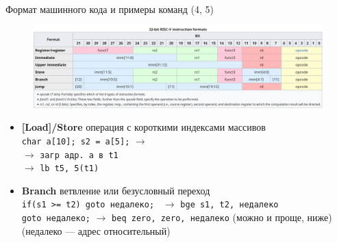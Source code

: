 \documentclass[xetex,aspectratio=43]{beamer}
\begin{document}
\begin{frame}[fragile]{Формат машинного кода и примеры команд (4, 5)}
    \begin{figure}
        \includegraphics[width=1\linewidth]{img/12.RISCV_instruction_format_wikipedia}
    \end{figure}

    \begin{itemize}
        \tightlist
        \item \textbf{[Load]/Store} операция с короткими индексами массивов\\
        \texttt{char a[10]; s2 = a[5];} $\rightarrow$ \\
        $\rightarrow$ \texttt{загр адр. a в t1} \\
        {\color{white}$\rightarrow$} \texttt{lb t5, 5(t1)}
        \item \textbf{Branch} ветвление или безусловный переход\\
        \texttt{if(s1 >= t2) goto недалеко; } $\rightarrow$
        \texttt{bge s1, t2, недалеко}\\
        \texttt{goto недалеко;} $\rightarrow$
        \texttt{beq zero, zero, недалеко} (можно и проще, ниже)\\
        (недалеко --- адрес относительный)
    \end{itemize}
\end{frame}
\end{document}
